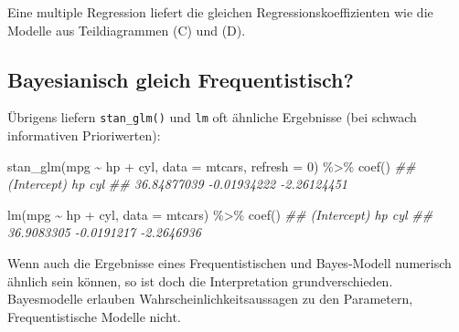\documentclass[
  a4paper,
  DIV=11]{scrreprt}
\newenvironment{Shaded}{\begin{snugshade}}{\end{snugshade}}
\newcommand{\AttributeTok}[1]{\textcolor[rgb]{0.40,0.45,0.13}{#1}}
\newcommand{\DecValTok}[1]{\textcolor[rgb]{0.68,0.00,0.00}{#1}}
\newcommand{\DocumentationTok}[1]{\textcolor[rgb]{0.37,0.37,0.37}{\textit{#1}}}
\newcommand{\FunctionTok}[1]{\textcolor[rgb]{0.28,0.35,0.67}{#1}}
\newcommand{\NormalTok}[1]{\textcolor[rgb]{0.00,0.23,0.31}{#1}}
\newcommand{\SpecialCharTok}[1]{\textcolor[rgb]{0.37,0.37,0.37}{#1}}
\theoremstyle{definition}
\theoremstyle{remark}
\begin{document}
Eine multiple Regression liefert die gleichen Regressionskoeffizienten
wie die Modelle aus Teildiagrammen (C) und (D).

\hypertarget{bayesianisch-gleich-frequentistisch}{%
\subsection{Bayesianisch gleich
Frequentistisch?}\label{bayesianisch-gleich-frequentistisch}}

Übrigens liefern \texttt{stan\_glm()} und \texttt{lm} oft ähnliche
Ergebnisse (bei schwach informativen Prioriwerten):

\begin{Shaded}
\begin{Highlighting}[]
\FunctionTok{stan\_glm}\NormalTok{(mpg }\SpecialCharTok{\textasciitilde{}}\NormalTok{ hp }\SpecialCharTok{+}\NormalTok{ cyl, }\AttributeTok{data =}\NormalTok{ mtcars, }\AttributeTok{refresh =} \DecValTok{0}\NormalTok{) }\SpecialCharTok{\%\textgreater{}\%} \FunctionTok{coef}\NormalTok{()}
\DocumentationTok{\#\# (Intercept)          hp         cyl }
\DocumentationTok{\#\# 36.84877039 {-}0.01934222 {-}2.26124451}

\FunctionTok{lm}\NormalTok{(mpg }\SpecialCharTok{\textasciitilde{}}\NormalTok{ hp }\SpecialCharTok{+}\NormalTok{ cyl, }\AttributeTok{data =}\NormalTok{ mtcars) }\SpecialCharTok{\%\textgreater{}\%} \FunctionTok{coef}\NormalTok{()}
\DocumentationTok{\#\# (Intercept)          hp         cyl }
\DocumentationTok{\#\#  36.9083305  {-}0.0191217  {-}2.2646936}
\end{Highlighting}
\end{Shaded}

\begin{tcolorbox}[enhanced jigsaw, title=\textcolor{quarto-callout-important-color}{\faExclamation}\hspace{0.5em}{Wichtig}, bottomtitle=1mm, bottomrule=.15mm, titlerule=0mm, colbacktitle=quarto-callout-important-color!10!white, colframe=quarto-callout-important-color-frame, leftrule=.75mm, left=2mm, toprule=.15mm, colback=white, arc=.35mm, breakable, toptitle=1mm, opacityback=0, rightrule=.15mm, coltitle=black, opacitybacktitle=0.6]

Wenn auch die Ergebnisse eines Frequentistischen und Bayes-Modell
numerisch ähnlich sein können, so ist doch die Interpretation
grundverschieden. Bayesmodelle erlauben Wahrscheinlichkeitsaussagen zu
den Parametern, Frequentistische Modelle nicht.

\end{tcolorbox}
\end{document}
